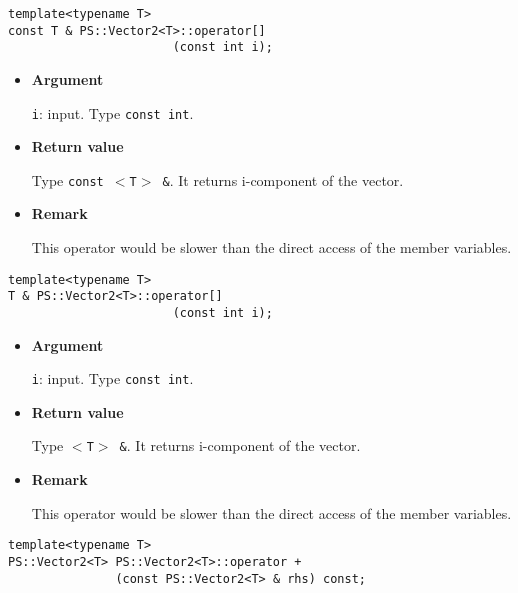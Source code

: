 
\begin{screen}
\begin{verbatim}
template<typename T>
const T & PS::Vector2<T>::operator[]
                       (const int i);
\end{verbatim}
\end{screen}

\begin{itemize}

\item{{\bf Argument}}

\texttt{i}: input. Type \texttt{const int}.

\item{{\bf Return value}}

Type \texttt{const $<$T$>$ \&}. It returns i-component of the vector.

\item{{\bf Remark}}

This operator would be slower than the direct access of the member variables.

\end{itemize}

\begin{screen}
\begin{verbatim}
template<typename T>
T & PS::Vector2<T>::operator[]
                       (const int i);
\end{verbatim}
\end{screen}

\begin{itemize}

\item{{\bf Argument}}

\texttt{i}: input. Type \texttt{const int}.

\item{{\bf Return value}}

Type \texttt{$<$T$>$ \&}. It returns i-component of the vector.

\item{{\bf Remark}}

This operator would be slower than the direct access of the member variables.

\end{itemize}


\begin{screen}
\begin{verbatim}
template<typename T>
PS::Vector2<T> PS::Vector2<T>::operator + 
               (const PS::Vector2<T> & rhs) const;
\end{verbatim}
\end{screen}

